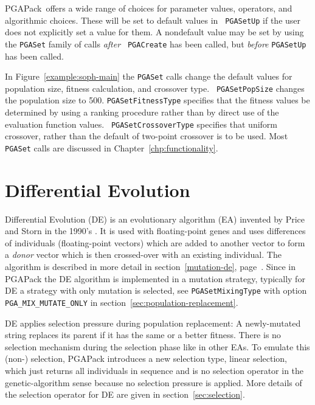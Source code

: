 \documentclass{report}
\newcommand{\pga}{PGAPack}
\begin{document}
\pga\ offers a wide range of choices for parameter values, operators,
and algorithmic choices.  These will be set to default values in {\tt
PGASetUp} if the user does not explicitly set a value for them.  A nondefault
value may be set by using the {\tt PGASet} family of calls {\em after} {\tt
PGACreate} has been called, but {\em before} {\tt PGASetUp} has been called.

In Figure~\ref{example:soph-main} the {\tt PGASet} calls change the default
values for population size, fitness calculation, and crossover type.  {\tt
PGASetPopSize} changes the population size to 500.  {\tt PGASetFitnessType}
specifies that the fitness values be determined by using a ranking procedure
rather than by direct use of the evaluation function values.  {\tt
PGASetCrossoverType} specifies that uniform crossover, rather than the default
of two-point crossover is to be used.  Most {\tt PGASet} calls are discussed
in Chapter~\ref{chp:functionality}.

\section{Differential Evolution}\label{sec:differential-evolution}

Differential Evolution (DE) is an evolutionary algorithm (EA) invented by
Price and Storn in the 1990's \cite{SP95,SP97,PSL05}. It is used with
floating-point genes and uses differences of individuals (floating-point
vectors) which are added to another vector to form a \textit{donor}
vector which is then crossed-over with an existing individual.
The algorithm is described in more detail in section~\ref{mutation-de},
page~\pageref{mutation-de}. Since in \pga{} the DE algorithm is
implemented in a mutation strategy, typically for DE a strategy with
only mutation is selected, see \verb+PGASetMixingType+ with option
\verb+PGA_MIX_MUTATE_ONLY+ in section~\ref{sec:population-replacement}.

DE applies
selection pressure during population replacement: A newly-mutated string
replaces its parent if it has the same or a better fitness. There is no
selection mechanism during the selection phase like in other EAs. To
emulate this (non-) selection, \pga{} introduces a new selection type, linear
selection, which just returns all individuals in sequence and is no
selection operator in the genetic-algorithm sense because no selection
pressure is applied. More details of the selection operator for DE are
given in section~\ref{sec:selection}.
\end{document}
